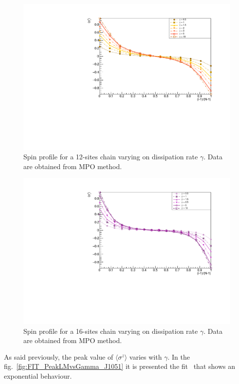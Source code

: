 \begin{figure}[H]
    \centering
    \includegraphics[scale=0.7]{Figures/12sites/12sites_LMvsGamma.pdf}
    \caption{Spin profile for a 12-sites chain varying on dissipation rate $\gamma$. Data are obtained from MPO method.}
    \label{fig:12sites_LMvsGamma}
\end{figure}

\begin{figure}[H]
    \centering
    \includegraphics[scale=0.7]{Figures/16sites/16sites_LMvsGamma.pdf}
    \caption{Spin profile for a 16-sites chain varying on dissipation rate $\gamma$. Data are obtained from MPO method.}
    \label{fig:16sites_LMvsGamma}
\end{figure}

As said previously, the peak value of $\langle\sigma^z\rangle$ varies with $\gamma$. In the fig.~\ref{fig:FIT_PeakLMvsGamma_J1051} it is presented the fit~\cite{root_cern} that shows an exponential behaviour. 


